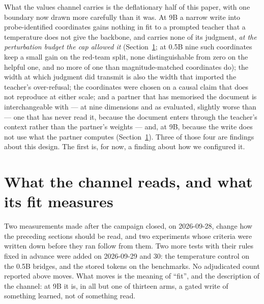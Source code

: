\documentclass[11pt]{article}
\begin{document}
What the values channel carries is the deflationary half of this paper, with one boundary now drawn more carefully than it was. At 9B a narrow write into probe-identified coordinates gains nothing in fit to a prompted teacher that a temperature does not give the backbone, and carries none of its judgment, \emph{at the perturbation budget the cap allowed it} (Section~\ref{sec:reads}; at 0.5B nine such coordinates keep a small gain on the red-team split, none distinguishable from zero on the helpful one, and no more of one than magnitude-matched coordinates do); the width at which judgment did transmit is also the width that imported the teacher's over-refusal; the coordinates were chosen on a causal claim that does not reproduce at either scale; and a partner that has memorised the document is interchangeable with --- at nine dimensions and as evaluated, slightly worse than --- one that has never read it, because the document enters through the teacher's context rather than the partner's weights --- and, at 9B, because the write does not use what the partner computes (Section~\ref{sec:reads}). Three of those four are findings about this design. The first is, for now, a finding about how we configured it.


\section{What the channel reads, and what its fit measures}
\label{sec:reads}

Two measurements made after the campaign closed, on 2026-09-28, change how the
preceding sections should be read, and two experiments whose criteria were written
down before they ran follow from them. Two more tests with their rules fixed in
advance were added on 2026-09-29 and 30: the temperature control on the 0.5B
bridges, and the stored tokens on the benchmarks. No adjudicated count reported
above moves.
What moves is the meaning of ``fit'', and the description of the channel: at 9B it
is, in all but one of thirteen arms, a gated write of something learned, not of
something read.
\end{document}
